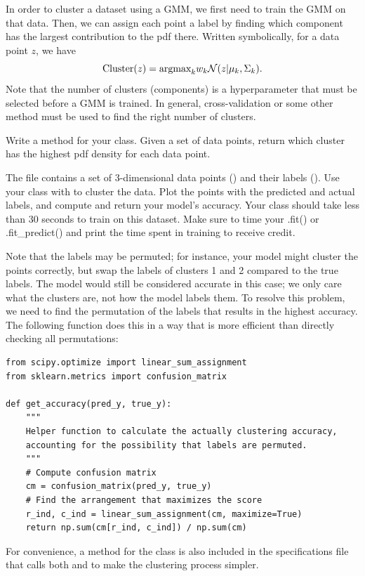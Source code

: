 In order to cluster a dataset using a GMM, we first need to train the GMM on that data.
Then, we can assign each point a label by finding which component has the largest contribution to the pdf there.
Written symbolically, for a data point \(z\), we have
\[
\mathrm{Cluster}(z)=\mbox{argmax}_k w_k \mathcal{N}(z|\mu_k, \Sigma_k).
\]
Note that the number of clusters (components) is a hyperparameter that must be selected before a GMM is trained.
In general, cross-validation or some other method must be used to find the right number of clusters.


\begin{problem}
Write a  method for your class.
Given a set of data points, return which cluster has the highest pdf density for each data point.

The file  contains a set of 3-dimensional data points () and their labels ().
Use your class with  to cluster the data.
Plot the points with the predicted and actual labels, and compute and return your model's accuracy.
Your class should take less than 30 seconds to train on this dataset. Make sure to time your .fit() or .fit\_predict()
and print the time spent in training to receive credit.

Note that the labels may be permuted; for instance, your model might cluster the points correctly, but swap the labels of clusters 1 and 2 compared to the true labels.
The model would still be considered accurate in this case; we only care what the clusters are, not how the model labels them.
To resolve this problem, we need to find the permutation of the labels that results in the highest accuracy.
The following function does this in a way that is more efficient than directly checking all permutations:
\begin{lstlisting}
from scipy.optimize import linear_sum_assignment
from sklearn.metrics import confusion_matrix

def get_accuracy(pred_y, true_y):
    """
    Helper function to calculate the actually clustering accuracy,
    accounting for the possibility that labels are permuted.
    """
    # Compute confusion matrix
    cm = confusion_matrix(pred_y, true_y)
    # Find the arrangement that maximizes the score
    r_ind, c_ind = linear_sum_assignment(cm, maximize=True)
    return np.sum(cm[r_ind, c_ind]) / np.sum(cm)
\end{lstlisting}

For convenience, a method  for the class is also included in the specifications file that calls both  and  to make the clustering process simpler.
\end{problem}

